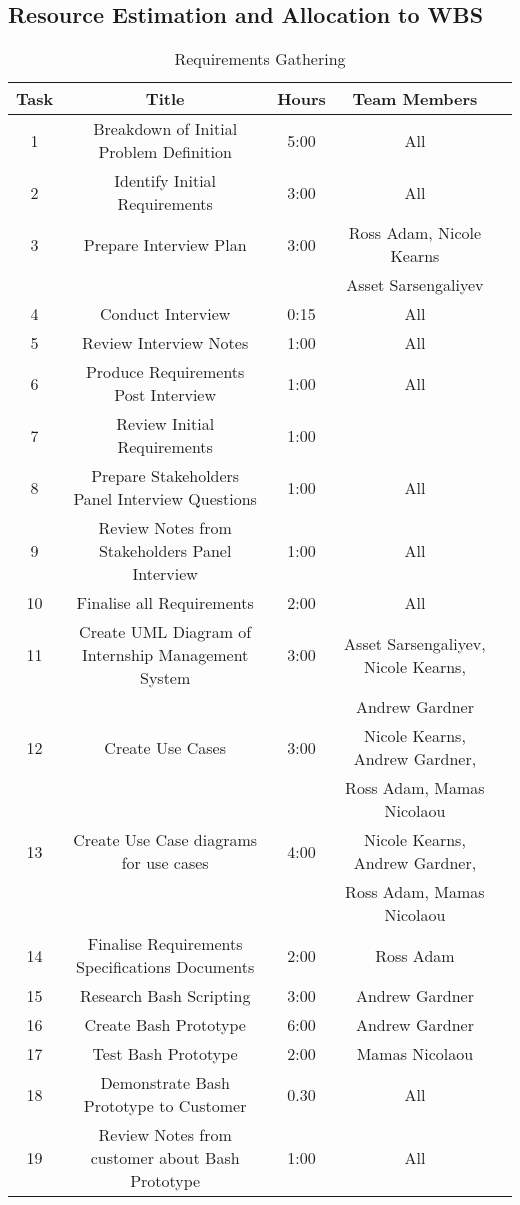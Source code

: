\documentclass{l3deliverable}
\begin{document}
{\subsection{Resource Estimation and Allocation to WBS\label{sec:allocation}}

\begin{table}[ht]
\caption{Requirements Gathering} %
\centering  %
\begin{tabular}{|c |c |c |c |c |} %
\hline\hline                        %
Task & Title & Hours & Team Members \\ [0.5ex] %
\hline                  %
1 & Breakdown of Initial Problem Definition & 5:00  & All\\ %
2 & Identify Initial Requirements & 3:00  & All\\
3 & Prepare Interview Plan & 3:00  & Ross Adam, Nicole Kearns\\
 & & & Asset Sarsengaliyev \\
4 & Conduct Interview & 0:15  & All\\
5 & Review Interview Notes& 1:00  & All\\
6 & Produce Requirements Post Interview & 1:00 & All\\
7 & Review Initial Requirements & 1:00 & \\
8 & Prepare Stakeholders Panel Interview Questions & 1:00 & All\\
9 & Review Notes from Stakeholders Panel Interview & 1:00 & All \\
10 & Finalise all Requirements & 2:00 & All\\
11 & Create UML Diagram of Internship Management System & 3:00 & Asset Sarsengaliyev, Nicole Kearns,\\
 & & & Andrew Gardner \\
12 & Create Use Cases & 3:00 & Nicole Kearns, Andrew Gardner, \\
 & & & Ross Adam, Mamas Nicolaou \\
13 & Create Use Case diagrams for use cases & 4:00 & Nicole Kearns, Andrew Gardner, \\
 & & & Ross Adam, Mamas Nicolaou \\
14 & Finalise Requirements Specifications Documents & 2:00 & Ross Adam \\
15 & Research Bash Scripting & 3:00 & Andrew Gardner\\
16 & Create Bash Prototype & 6:00 & Andrew Gardner \\
17 & Test Bash Prototype & 2:00 & Mamas Nicolaou \\
18 & Demonstrate Bash Prototype to Customer & 0.30 & All\\     
19 & Review Notes from customer about Bash Prototype & 1:00 & All\\      


\end{tabular}
\end{table}}
\end{document}
